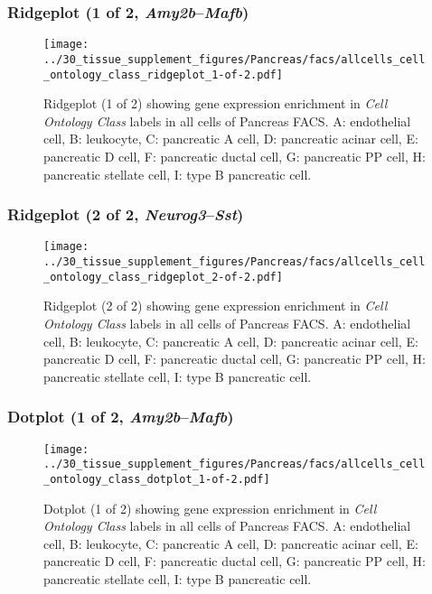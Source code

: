 \clearpage

\subsubsection{Ridgeplot (1 of 2, \emph{Amy2b}--\emph{Mafb})}
\begin{figure}[h]
\centering
\texttt{[image: ../30\_tissue\_supplement\_figures/Pancreas/facs/allcells\_cell\_ontology\_class\_ridgeplot\_1-of-2.pdf]}

\caption{ Ridgeplot (1 of 2)  showing gene expression enrichment in \emph{Cell Ontology Class} labels in all cells of Pancreas FACS. A: endothelial cell, B: leukocyte, C: pancreatic A cell, D: pancreatic acinar cell, E: pancreatic D cell, F: pancreatic ductal cell, G: pancreatic PP cell, H: pancreatic stellate cell, I: type B pancreatic cell.}
\end{figure}


\clearpage

\subsubsection{Ridgeplot (2 of 2, \emph{Neurog3}--\emph{Sst})}
\begin{figure}[h]
\centering
\texttt{[image: ../30\_tissue\_supplement\_figures/Pancreas/facs/allcells\_cell\_ontology\_class\_ridgeplot\_2-of-2.pdf]}

\caption{ Ridgeplot (2 of 2)  showing gene expression enrichment in \emph{Cell Ontology Class} labels in all cells of Pancreas FACS. A: endothelial cell, B: leukocyte, C: pancreatic A cell, D: pancreatic acinar cell, E: pancreatic D cell, F: pancreatic ductal cell, G: pancreatic PP cell, H: pancreatic stellate cell, I: type B pancreatic cell.}
\end{figure}


\clearpage

\subsubsection{Dotplot (1 of 2, \emph{Amy2b}--\emph{Mafb})}
\begin{figure}[h]
\centering
\texttt{[image: ../30\_tissue\_supplement\_figures/Pancreas/facs/allcells\_cell\_ontology\_class\_dotplot\_1-of-2.pdf]}

\caption{ Dotplot (1 of 2)  showing gene expression enrichment in \emph{Cell Ontology Class} labels in all cells of Pancreas FACS. A: endothelial cell, B: leukocyte, C: pancreatic A cell, D: pancreatic acinar cell, E: pancreatic D cell, F: pancreatic ductal cell, G: pancreatic PP cell, H: pancreatic stellate cell, I: type B pancreatic cell.}
\end{figure}


